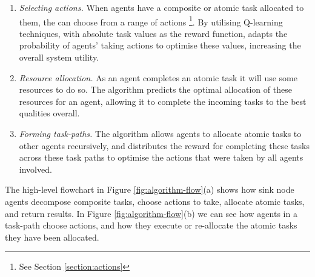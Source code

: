 \begin{enumerate}
	\item \textit{Selecting actions.} When agents have a composite or atomic task allocated to them, the can choose from a range of actions \footnote{See Section \ref{section:actions}}. By utilising Q-learning techniques, with absolute task values as the reward function, \acronymWSNOptimisation{}{} adapts the probability of agents' taking actions to optimise these values, increasing the overall system utility. 
	
	\item \textit{Resource allocation.} As an agent completes an atomic task it will use some resources to do so. The \acronymWSNOptimisation{}{} algorithm predicts the optimal allocation of these resources for an agent, allowing it to complete the incoming tasks to the best qualities overall.
	
	\item \textit{Forming task-paths. }The algorithm allows agents to allocate atomic tasks to other agents recursively, and distributes the reward for completing these tasks across these task paths to optimise the actions that were taken by all agents involved.
\end{enumerate}
The high-level flowchart in Figure \ref{fig:algorithm-flow}(a) shows how sink node agents decompose composite tasks, choose actions to take, allocate atomic tasks, and return results. In Figure \ref{fig:algorithm-flow}(b) we can see how agents in a task-path choose actions, and how they execute or re-allocate the atomic tasks they have been allocated.
